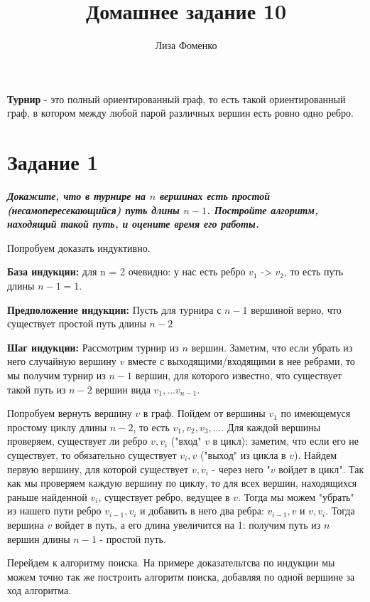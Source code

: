 \documentclass{article}
\title{Домашнее задание 10}
\author{Лиза Фоменко}
\date{}
\begin{document}
\maketitle

\textbf{Турнир} - это полный ориентированный граф, то есть такой ориентированный граф, в котором между любой парой различных вершин есть ровно одно ребро.

\section*{\textbf{Задание 1}} \textbf{\textit{Докажите, что в турнире на $n$ вершинах есть простой (несамопересекающийся) путь длины $n - 1$. Постройте алгоритм, находящий такой путь, и оцените время его работы.}}

Попробуем доказать индуктивно.

\textbf{База индукции:} для n = 2 очевидно: у нас есть ребро $v_1$ -> $v_2$, то есть путь длины $n-1 = 1$. 

\textbf{Предположение индукции:} Пусть для турнира с $n-1$ вершиной верно, что существует простой путь длины $n-2$ 

\textbf{Шаг индукции:} Рассмотрим турнир из $n$ вершин. Заметим, что если убрать из него случайную вершину $v$ вместе с выходящими/входящими в нее ребрами, то мы получим турнир из $n-1$ вершин, для которого известно, что существует такой путь из $n-2$ вершин вида $v_1, ... v_{n-1}$. 

Попробуем вернуть вершину $v$ в граф. Пойдем от вершины $v_1$ по имеющемуся простому циклу длины $n-2$, то есть $v_1, v_2, v_3, ...$. Для каждой вершины проверяем, существует ли ребро $v, v_i$ ("вход" $v$ в цикл): заметим, что если его не существует, то обязательно существует $v_i, v$ ("выход" из цикла в $v$). Найдем первую вершину, для которой существует  $v, v_i$ - через него "$v$ войдет в цикл". Так как мы проверяем каждую вершину по циклу, то для всех вершин, находящихся раньше найденной $v_i$, существует ребро, ведущее в $v$. Тогда мы можем "убрать" из нашего пути ребро $v_{i-1}, v_i$ и добавить в него два ребра: $v_{i-1}, v$ и $v, v_i$. Тогда вершина $v$ войдет в путь, а его длина увеличится на 1: получим путь из $n$ вершин длины $n-1$ - простой путь.

Перейдем к алгоритму поиска. На примере доказательтсва по индукции мы можем точно так же построить алгоритм поиска, добавляя по одной вершине за ход алгоритма.
\end{document}
